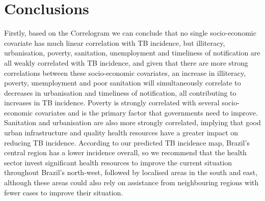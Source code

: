 \section{Conclusions}
Firstly, based on the Correlogram we can conclude that no single socio-economic covariate has much linear correlation with TB incidence, but illiteracy, urbanisation, poverty, sanitation, unemployment and timeliness of notification are all weakly correlated with TB incidence, and given that there are more strong correlations between these socio-economic covariates, an increase in illiteracy, poverty, unemployment and poor sanitation will simultaneously correlate to decreases in urbanisation and timeliness of notification, all contributing to increases in TB incidence. Poverty is strongly correlated with several socio-economic covariates and is the primary factor that governments need to improve. Sanitation and urbanisation are also more strongly correlated, implying that good urban infrastructure and quality health resources have a greater impact on reducing TB incidence. According to our predicted TB incidence map, Brazil's central region has a lower incidence overall, so we recommend that the health sector invest significant health resources to improve the current situation throughout Brazil's north-west, followed by localised areas in the south and east, although these areas could also rely on assistance from neighbouring regions with fewer cases to improve their situation.